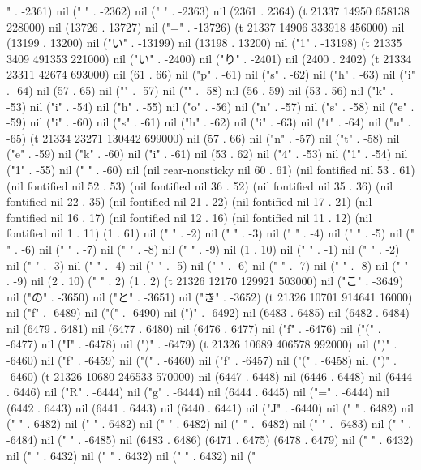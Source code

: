 " . -2361) nil (" " . -2362) nil (" " . -2363) nil (2361 . 2364) (t 21337 14950 658138 228000) nil (13726 . 13727) nil ("=" . -13726) (t 21337 14906 333918 456000) nil (13199 . 13200) nil ("い" . -13199) nil (13198 . 13200) nil ("1" . -13198) (t 21335 3409 491353 221000) nil ("い" . -2400) nil ("り" . -2401) nil (2400 . 2402) (t 21334 23311 42674 693000) nil (61 . 66) nil ("p" . -61) nil ("s" . -62) nil ("h" . -63) nil ("i" . -64) nil (57 . 65) nil ("{" . -57) nil ("}" . -58) nil (56 . 59) nil (53 . 56) nil ("k" . -53) nil ("i" . -54) nil ("h" . -55) nil ("o" . -56) nil ("n" . -57) nil ("s" . -58) nil ("e" . -59) nil ("i" . -60) nil ("s" . -61) nil ("h" . -62) nil ("i" . -63) nil ("t" . -64) nil ("u" . -65) (t 21334 23271 130442 699000) nil (57 . 66) nil ("n" . -57) nil ("t" . -58) nil ("e" . -59) nil ("k" . -60) nil ("i" . -61) nil (53 . 62) nil ("4" . -53) nil ("1" . -54) nil ("1" . -55) nil ("
" . -60) nil (nil rear-nonsticky nil 60 . 61) (nil fontified nil 53 . 61) (nil fontified nil 52 . 53) (nil fontified nil 36 . 52) (nil fontified nil 35 . 36) (nil fontified nil 22 . 35) (nil fontified nil 21 . 22) (nil fontified nil 17 . 21) (nil fontified nil 16 . 17) (nil fontified nil 12 . 16) (nil fontified nil 11 . 12) (nil fontified nil 1 . 11) (1 . 61) nil (" " . -2) nil (" " . -3) nil (" " . -4) nil (" " . -5) nil (" " . -6) nil (" " . -7) nil (" " . -8) nil (" " . -9) nil (1 . 10) nil ("
" . -1) nil (" " . -2) nil (" " . -3) nil (" " . -4) nil (" " . -5) nil (" " . -6) nil (" " . -7) nil (" " . -8) nil (" " . -9) nil (2 . 10) (" " . 2) (1 . 2) (t 21326 12170 129921 503000) nil ("こ" . -3649) nil ("の" . -3650) nil ("と" . -3651) nil ("き" . -3652) (t 21326 10701 914641 16000) nil ("f" . -6489) nil ("(" . -6490) nil (")" . -6492) nil (6483 . 6485) nil (6482 . 6484) nil (6479 . 6481) nil (6477 . 6480) nil (6476 . 6477) nil ("f" . -6476) nil ("(" . -6477) nil ("I" . -6478) nil (")" . -6479) (t 21326 10689 406578 992000) nil (")" . -6460) nil ("f" . -6459) nil ("(" . -6460) nil ("f" . -6457) nil ("(" . -6458) nil (")" . -6460) (t 21326 10680 246533 570000) nil (6447 . 6448) nil (6446 . 6448) nil (6444 . 6446) nil ("R" . -6444) nil ("g" . -6444) nil (6444 . 6445) nil ("=" . -6444) nil (6442 . 6443) nil (6441 . 6443) nil (6440 . 6441) nil ("J" . -6440) nil (" " . 6482) nil (" " . 6482) nil (" " . 6482) nil ("
" . 6482) nil ("
" . -6482) nil (" " . -6483) nil (" " . -6484) nil (" " . -6485) nil (6483 . 6486) (6471 . 6475) (6478 . 6479) nil (" " . 6432) nil (" " . 6432) nil (" " . 6432) nil ("
" . 6432) nil ("
